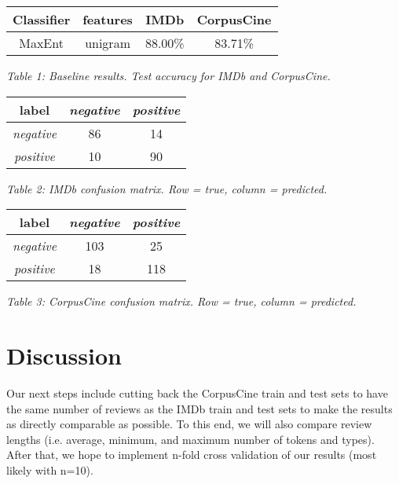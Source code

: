 \documentclass[11pt]{article}
\begin{document}
\vspace{5mm}
{\centering
\begin{tabular}{|c|c|c|c|}
\hline
\textbf{Classifier} & \textbf{features} & \textbf{IMDb} & \textbf{CorpusCine} \\ \hline
MaxEnt & unigram & 88.00\% & 83.71\% \\ \hline
\end{tabular}

\vspace{1mm}
\emph{Table 1: Baseline results.  Test accuracy for IMDb and CorpusCine.}
\par}

\vspace{5mm}
{\centering
\begin{tabular}{|c|c|c|}
\hline
\textbf{label} & \emph{negative} & \emph{positive} \\ \hline
\emph{negative} & 86 & 14 \\ \hline
\emph{positive} & 10 & 90 \\ \hline
\end{tabular}

\vspace{1mm}
\emph{Table 2: IMDb confusion matrix. Row = true, column = predicted.}
\par}

\vspace{5mm}
{\centering
\begin{tabular}{|c|c|c|}
\hline
\textbf{label} & \emph{negative} & \emph{positive} \\ \hline
\emph{negative} & 103 & 25 \\ \hline
\emph{positive} & 18 & 118 \\ \hline
\end{tabular}

\vspace{1mm}
\emph{Table 3: CorpusCine confusion matrix. Row = true, column = predicted.}
\par}

\section{Discussion}

Our next steps include cutting back the CorpusCine train and test sets to have the same number of reviews as the IMDb train and test sets to make the results as directly comparable as possible.  To this end, we will also compare review lengths (i.e. average, minimum, and maximum number of tokens and types).  After that, we hope to implement n-fold cross validation of our results (most likely with n=10). 
\end{document}
